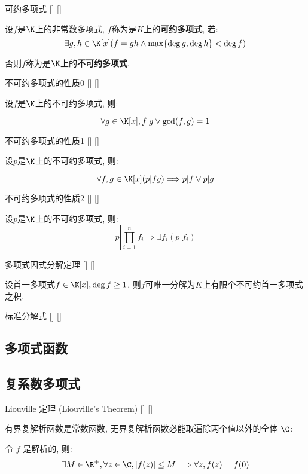 \documentclass[UTF8]{ctexart}
\begin{document}
		\begin{dfn}
			[]
			{可约多项式}
			[]
			[]

			设$f$是$\K$上的非常数多项式, $f$称为是$K$上的\textbf{可约多项式}, 若: 
			\[\exists g,h\in\K[x](f=gh\wedge\max\{\deg g, \deg h\}<\deg f)\]
			
			否则$f$称为是$\K$上的\textbf{不可约多项式}. 
		\end{dfn}
		
		\begin{ppt}
			[]
			{不可约多项式的性质0}
			[]
			[]

			设$f$是$\K$上的不可约多项式, 则: 
			
			\[\forall g\in\K[x], f|g\vee\gcd(f,g)=1\]
		\end{ppt}
		
		\begin{ppt}
			[]
			{不可约多项式的性质1}
			[]
			[]

			设$p$是$\K$上的不可约多项式, 则: 

			\[\forall f,g\in\K[x](p|fg)\Longrightarrow p|f\vee p|g\]
		\end{ppt}
		
		\begin{ppt}
			[]
			{不可约多项式的性质2}
			[]
			[]

			设$p$是$\K$上的不可约多项式, 则: 
			\[p\left|\prod_{i=1}^n\right. f_i\Longrightarrow\exists f_i(p|f_i)\]
		\end{ppt}
		
		\begin{thm}
			[]
			{多项式因式分解定理}
			[]
			[]

			设首一多项式$f\in\K[x], \deg f\geq 1$, 则$f$可唯一分解为$K$上有限个不可约首一多项式之积. 
		\end{thm}
		
		\begin{dfn}
			[]
			{标准分解式}
			[]
			[]


		\end{dfn}

	\subsection{多项式函数}
	
	\subsection{复系数多项式}

		\begin{thm}
			[]
			{Liouville 定理 (Liouville's Theorem)}
			[]
			[]

			有界复解析函数是常数函数, 无界复解析函数必能取遍除两个值以外的全体 \(\C\): 

			令 \(f\) 是解析的, 则: 
			\[\exists M\in\R^+, \forall z\in\C, |f(z)|\leq M\Longrightarrow\forall z, f(z)=f(0)\]
		\end{thm}
	
\end{document}
